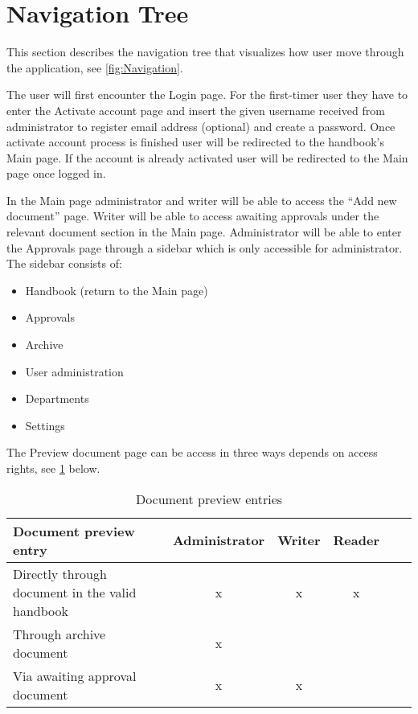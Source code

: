 \section{Navigation Tree}
This section describes the navigation tree that visualizes how user move through the application, see \cref{fig:Navigation}.


The user will first encounter the Login page.
For the first-timer user they have to enter the Activate account page and insert the given username received from administrator to register email address (optional) and create a password.
Once activate account process is finished user will be redirected to the handbook's Main page.
If the account is already activated user will be redirected to the Main page once logged in.

In the Main page administrator and writer will be able to access the ``Add new document'' page.
Writer will be able to access awaiting approvals under the relevant document section in the Main page.
Administrator will be able to enter the Approvals page through a sidebar which is only accessible for administrator.
The sidebar consists of:

\begin{itemize}
	\item Handbook (return to the Main page)
	\item Approvals
	\item Archive
	\item User administration
	\item Departments
	\item Settings
\end{itemize}

The Preview document page can be access in three ways depends on access rights, see \cref{tab:docPreviewEntries} below.

\begin{table}[H]
	\begin{center}
	\begin{tabular}{| m{20em} | c | c | c | c | c |}
		\hline
		Document preview entry & Administrator & Writer & Reader \\
		\hline
		 Directly through document in the valid handbook & x  & x & x\\
		\hline
		 Through archive document  & x &  & \\
		\hline
		 Via awaiting approval document & x & x &  \\
		\hline
	\end{tabular}
	\end{center}
	\caption{Document preview entries}\label{tab:docPreviewEntries}
\end{table}

